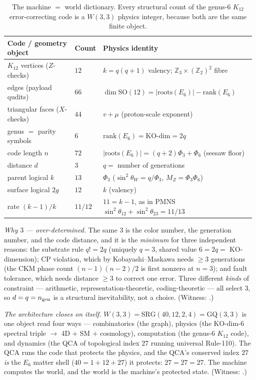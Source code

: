 \documentclass[11pt]{article}
\begin{document}
\begin{table}[ht]\centering\small
\caption{The machine $=$ world dictionary. Every structural count of the genus-$6$ $K_{12}$
error-correcting code is a $W(3,3)$ physics integer, because both are the same finite object.}
\label{tab:machine-world}
\begin{tabular}{l l l}
\toprule
Code / geometry object & Count & Physics identity\\ \midrule
$K_{12}$ vertices ($Z$-checks) & $12$ & $k=q(q{+}1)$ valency; $\mathbb{Z}_3{\times}(\mathbb{Z}_2)^2$ fibre\\
edges (payload qudits) & $66$ & $\dim\mathrm{SO}(12)=|\mathrm{roots}(E_6)|-\mathrm{rank}(E_6)$\\
triangular faces ($X$-checks) & $44$ & $v+\mu$ (proton-scale exponent)\\
genus $=$ parity symbols & $6$ & $\mathrm{rank}(E_6)=\text{KO-dim}=2q$\\
code length $n$ & $72$ & $|\mathrm{roots}(E_6)|=(q{+}2)\Phi_3+\Phi_6$ (seesaw floor)\\
distance $d$ & $3$ & $q=$ number of generations\\
parent logical $k$ & $13$ & $\Phi_3$ ($\sin^2\theta_W=q/\Phi_3$, $M_Z=\Phi_3\Phi_6$)\\
surface logical $2g$ & $12$ & $k$ (valency)\\
rate $(k{-}1)/k$ & $11/12$ & $11=k{-}1$, as in PMNS $\sin^2\theta_{12}{+}\sin^2\theta_{23}=11/13$\\
\bottomrule
\end{tabular}
\end{table}

\emph{Why $3$ --- over-determined.} The same $3$ is the color number, the generation number, and
the code distance, and it is the \emph{minimum} for three independent reasons: the substrate rule
$q!=2q$ (uniquely $q=3$, shared value $6=2q=$ KO-dimension); CP violation, which by
Kobayashi--Maskawa needs $\ge3$ generations (the CKM phase count $(n{-}1)(n{-}2)/2$ is first
nonzero at $n=3$); and fault tolerance, which needs distance $\ge3$ to correct one error. Three
different \emph{kinds} of constraint --- arithmetic, representation-theoretic, coding-theoretic ---
all select $3$, so $d=q=n_{\rm gen}$ is a structural inevitability, not a choice. (Witness:
.)

\emph{The architecture closes on itself.} $W(3,3)=\mathrm{SRG}(40,12,2,4)=\mathrm{GQ}(3,3)$ is one
object read four ways --- combinatorics (the graph), physics (the KO-dim-$6$ spectral triple $\to$
4D $+$ SM $+$ cosmology), computation (the genus-$6$ $K_{12}$ code), and dynamics (the QCA of
topological index $27$ running universal Rule-110). The QCA runs the code that protects the
physics, and the QCA's conserved index $27$ \emph{is} the $E_6$ matter shell ($40=1+12+27$) it
protects: $27=27=27$. The machine computes the world, and the world is the machine's protected
state. (Witness: .)
\end{document}
